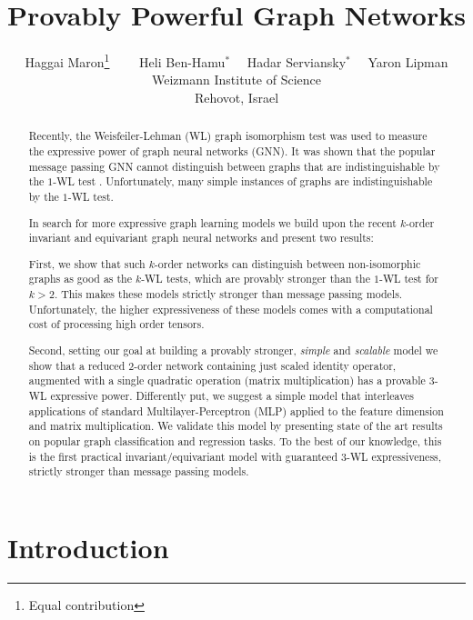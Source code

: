 \documentclass{article}
\title{Provably Powerful Graph Networks}
\author{
	Haggai Maron\thanks{Equal contribution} \ \ \   \  Heli Ben-Hamu$^*$ \ \  Hadar Serviansky$^*$ \ \ 	Yaron Lipman \\
Weizmann Institute of Science\\
	Rehovot, Israel \\
}
\begin{document}
\maketitle

\begin{abstract}
Recently, the Weisfeiler-Lehman (WL) graph isomorphism test was used to measure the expressive power of graph neural networks (GNN). It was shown that the popular message passing GNN cannot distinguish between graphs that are indistinguishable by the $1$-WL test \citep{morris2018weisfeiler,xu2018how}. Unfortunately, many simple instances of graphs are indistinguishable by the $1$-WL test. 

In search for more expressive graph learning models we build upon the recent $k$-order invariant and equivariant graph neural networks \citep{maron2018invariant, maron2019universality}  and present two results: 

First, we show that such $k$-order networks can distinguish between non-isomorphic graphs as good as the $k$-WL tests, which are provably stronger than the $1$-WL test for $k>2$. This makes these models strictly stronger than message passing models. Unfortunately, the higher expressiveness of these models comes with a computational cost of processing high order tensors. 

Second, setting our goal at building a provably stronger, \emph{simple} and \emph{scalable}  model we show that a reduced $2$-order network containing just scaled identity operator, augmented with a single quadratic operation (matrix multiplication) has a provable $3$-WL expressive power. Differently put, we suggest a simple model that interleaves applications of standard Multilayer-Perceptron (MLP) applied to the feature dimension and matrix multiplication. 
We validate this model by presenting state of the art results on popular graph classification and regression tasks. To the best of our knowledge, this is the first practical invariant/equivariant model with guaranteed $3$-WL expressiveness, strictly stronger than message passing models.




\end{abstract}
\section{Introduction}
\end{document}
